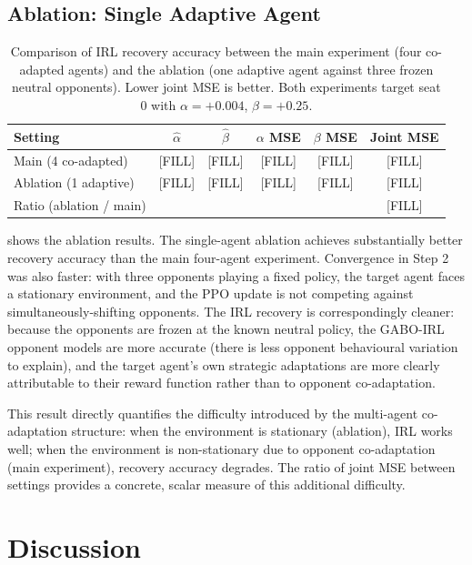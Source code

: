\documentclass{article}
\begin{document}
\subsection{Ablation: Single Adaptive Agent}

\begin{table}[t]
\caption{Comparison of IRL recovery accuracy between the main experiment (four co-adapted agents) and the ablation (one adaptive agent against three frozen neutral opponents). Lower joint MSE is better. Both experiments target seat 0 with $\alpha = +0.004$, $\beta = +0.25$.}
\label{tab:ablation}
\centering
\begin{tabular}{lccccc}
\toprule
Setting & $\hat\alpha$ & $\hat\beta$ & $\alpha$ MSE & $\beta$ MSE & Joint MSE \\
\midrule
Main (4 co-adapted)   & [FILL] & [FILL] & [FILL] & [FILL] & [FILL] \\
Ablation (1 adaptive) & [FILL] & [FILL] & [FILL] & [FILL] & [FILL] \\
\midrule
Ratio (ablation / main) & & & & & [FILL] \\
\bottomrule
\end{tabular}
\end{table}

 shows the ablation results. The single-agent ablation achieves substantially better recovery accuracy than the main four-agent experiment. Convergence in Step 2 was also faster: with three opponents playing a fixed policy, the target agent faces a stationary environment, and the PPO update is not competing against simultaneously-shifting opponents. The IRL recovery is correspondingly cleaner: because the opponents are frozen at the known neutral policy, the GABO-IRL opponent models are more accurate (there is less opponent behavioural variation to explain), and the target agent's own strategic adaptations are more clearly attributable to their reward function rather than to opponent co-adaptation.

This result directly quantifies the difficulty introduced by the multi-agent co-adaptation structure: when the environment is stationary (ablation), IRL works well; when the environment is non-stationary due to opponent co-adaptation (main experiment), recovery accuracy degrades. The ratio of joint MSE between settings provides a concrete, scalar measure of this additional difficulty.

\section{Discussion}
\end{document}
